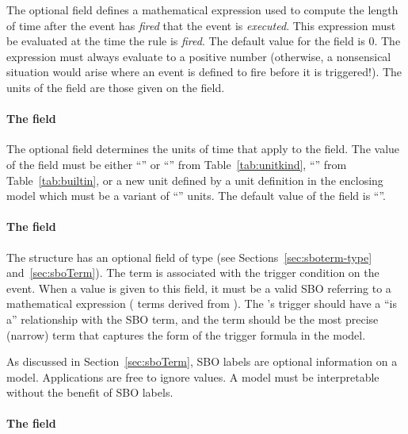 The optional  field defines a mathematical expression
used to compute the length of time after the event has
\emph{fired} that the event is \emph{executed}.  This expression
must be evaluated at the time the rule is \emph{fired}.  The
default value for the  field is 0.  The 
expression must always evaluate to a positive number (otherwise, a
nonsensical situation would arise where an event is defined to
fire before it is triggered!).  The units of the 
field are those given on the  field.


\paragraph{The  field}
\label{sec:event-timeunits}

The optional field  determines the units of time
that apply to the  field.  The value of the
 field must be either ``'' or
``'' from Table~\vref{tab:unitkind},
``'' from Table~\vref{tab:builtin}, or a new unit
defined by a unit definition in the enclosing model which must be
a variant of ``'' units.  The default value of the
 field is ``''.


\paragraph{The  field}

The \Event structure has an optional  field of type
 (see Sections~\ref{sec:sboterm-type}
and~\ref{sec:sboTerm}).  The term is associated with the trigger
condition on the event.  When a value is given to this field, it
must be a valid SBO referring to a mathematical expression (\ie
terms derived from \sbomathformula).  The \Event's trigger should
have a ``is a'' relationship with the SBO term, and the term
should be the most precise (narrow) term that captures the form of
the trigger formula in the model.

As discussed in Section~\ref{sec:sboTerm}, SBO labels are optional
information on a model.  Applications are free to ignore
 values.  A model must be interpretable without the
benefit of SBO labels.


\paragraph{The  field}
\label{sec:eventassignment}

